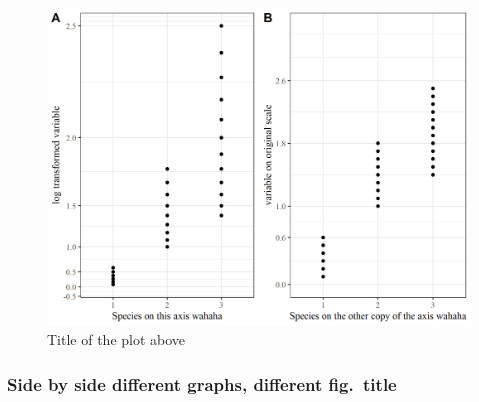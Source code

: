 \documentclass[]{elsarticle} %
\begin{document}
\begin{figure}[H]

{\centering \includegraphics[width=0.9\linewidth]{cookbook_files/figure-latex/two_log_norm_plot-1} 

}

\caption{Title of the plot above}\label{fig:two_log_norm_plot}
\end{figure}

\newpage

\hypertarget{side-by-side-different-graphs-different-fig.-title}{%
\subsubsection{Side by side different graphs, different
fig.~title}\label{side-by-side-different-graphs-different-fig.-title}}
\end{document}

